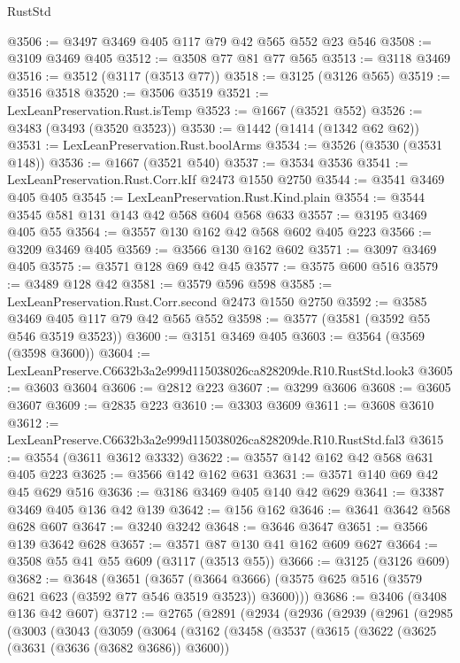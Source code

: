 \begin{lexlean}{RustStd}
\begin{coremodule}
@3506 := @3497 @3469 @405 @117 @79 @42 @565 @552 @23 @546
@3508 := @3109 @3469 @405
@3512 := @3508 @77 @81 @77 @565
@3513 := @3118 @3469
@3516 := @3512 (@3117 (@3513 @77))
@3518 := @3125 (@3126 @565)
@3519 := @3516 @3518
@3520 := @3506 @3519
@3521 := LexLeanPreservation.Rust.isTemp
@3523 := @1667 (@3521 @552)
@3526 := @3483 (@3493 (@3520 @3523))
@3530 := @1442 (@1414 (@1342 @62 @62))
@3531 := LexLeanPreservation.Rust.boolArms
@3534 := @3526 (@3530 (@3531 @148))
@3536 := @1667 (@3521 @540)
@3537 := @3534 @3536
@3541 := LexLeanPreservation.Rust.Corr.kIf @2473 @1550 @2750
@3544 := @3541 @3469 @405 @405
@3545 := LexLeanPreservation.Rust.Kind.plain
@3554 := @3544 @3545 @581 @131 @143 @42 @568 @604 @568 @633
@3557 := @3195 @3469 @405 @55
@3564 := @3557 @130 @162 @42 @568 @602 @405 @223
@3566 := @3209 @3469 @405
@3569 := @3566 @130 @162 @602
@3571 := @3097 @3469 @405
@3575 := @3571 @128 @69 @42 @45
@3577 := @3575 @600 @516
@3579 := @3489 @128 @42
@3581 := @3579 @596 @598
@3585 := LexLeanPreservation.Rust.Corr.second @2473 @1550 @2750
@3592 := @3585 @3469 @405 @117 @79 @42 @565 @552
@3598 := @3577 (@3581 (@3592 @55 @546 @3519 @3523))
@3600 := @3151 @3469 @405
@3603 := @3564 (@3569 (@3598 @3600))
@3604 := LexLeanPreserve.C6632b3a2e999d115038026ca828209de.R10.RustStd.look3
@3605 := @3603 @3604
@3606 := @2812 @223
@3607 := @3299 @3606
@3608 := @3605 @3607
@3609 := @2835 @223
@3610 := @3303 @3609
@3611 := @3608 @3610
@3612 := LexLeanPreserve.C6632b3a2e999d115038026ca828209de.R10.RustStd.fal3
@3615 := @3554 (@3611 @3612 @3332)
@3622 := @3557 @142 @162 @42 @568 @631 @405 @223
@3625 := @3566 @142 @162 @631
@3631 := @3571 @140 @69 @42 @45 @629 @516
@3636 := @3186 @3469 @405 @140 @42 @629
@3641 := @3387 @3469 @405 @136 @42 @139
@3642 := @156 @162
@3646 := @3641 @3642 @568 @628 @607
@3647 := @3240 @3242
@3648 := @3646 @3647
@3651 := @3566 @139 @3642 @628
@3657 := @3571 @87 @130 @41 @162 @609 @627
@3664 := @3508 @55 @41 @55 @609 (@3117 (@3513 @55))
@3666 := @3125 (@3126 @609)
@3682 := @3648
    (@3651
      (@3657 (@3664 @3666) (@3575 @625 @516 (@3579 @621 @623 (@3592 @77 @546 @3519 @3523)) @3600)))
@3686 := @3406 (@3408 @136 @42 @607)
@3712 := @2765
    (@2891
      (@2934
        (@2936
          (@2939
            (@2961
              (@2985
                (@3003
                  (@3043
                    (@3059
                      (@3064
                        (@3162
                          (@3458
                            (@3537
                              (@3615
                                (@3622
                                  (@3625 (@3631 (@3636 (@3682 @3686)) @3600))

\end{coremodule}
\end{lexlean}
